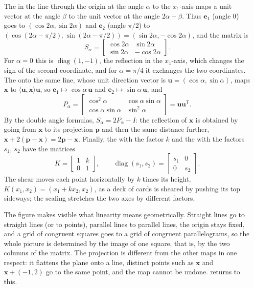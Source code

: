 The  in the line through the origin at the angle $\alpha$ to the $x_1$-axis maps a unit vector at the angle $\beta$ to the unit vector at the angle $2\alpha-\beta$. Thus $\mathbf e_1$ (angle $0$) goes to $(\cos2\alpha,\sin2\alpha)$ and $\mathbf e_2$ (angle $\pi/2$) to $(\cos(2\alpha-\pi/2),\sin(2\alpha-\pi/2))=(\sin2\alpha,-\cos2\alpha)$, and the matrix is
\[
S_\alpha=\begin{bmatrix}\cos2\alpha&\sin2\alpha\\\sin2\alpha&-\cos2\alpha\end{bmatrix}.
\]
For $\alpha=0$ this is $\operatorname{diag}(1,-1)$, the reflection in the $x_1$-axis, which changes the sign of the second coordinate, and for $\alpha=\pi/4$ it exchanges the two coordinates. The  onto the same line, whose unit direction vector is $\mathbf u=(\cos\alpha,\sin\alpha)$, maps $\mathbf x$ to $\langle\mathbf u,\mathbf x\rangle\mathbf u$, so $\mathbf e_1\mapsto\cos\alpha\,\mathbf u$ and $\mathbf e_2\mapsto\sin\alpha\,\mathbf u$, and
\[
P_\alpha=\begin{bmatrix}\cos^2\alpha&\cos\alpha\sin\alpha\\\cos\alpha\sin\alpha&\sin^2\alpha\end{bmatrix}=\mathbf u\mathbf u^{\mathsf T}.
\]
By the double angle formulas, $S_\alpha=2P_\alpha-I$: the reflection of $\mathbf x$ is obtained by going from $\mathbf x$ to its projection $\mathbf p$ and then the same distance further, $\mathbf x+2(\mathbf p-\mathbf x)=2\mathbf p-\mathbf x$. Finally, the  with the factor $k$ and the  with the factors $s_1$, $s_2$ have the matrices
\[
K=\begin{bmatrix}1&k\\0&1\end{bmatrix},\qquad\operatorname{diag}(s_1,s_2)=\begin{bmatrix}s_1&0\\0&s_2\end{bmatrix}.
\]
The shear moves each point horizontally by $k$ times its height, $K(x_1,x_2)=(x_1+kx_2,x_2)$, as a deck of cards is sheared by pushing its top sideways; the scaling stretches the two axes by different factors.

The figure makes visible what linearity means geometrically. Straight lines go to straight lines (or to points), parallel lines to parallel lines, the origin stays fixed, and a grid of congruent squares goes to a grid of congruent parallelograms, so the whole picture is determined by the image of one square, that is, by the two columns of the matrix. The projection is different from the other maps in one respect: it flattens the plane onto a line, distinct points such as $\mathbf x$ and $\mathbf x+(-1,2)$ go to the same point, and the map cannot be undone.  returns to this.

